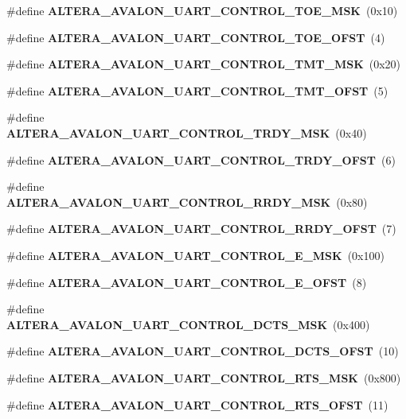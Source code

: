\begin{DoxyCompactItemize}
\item 
\#define {\bf A\+L\+T\+E\+R\+A\+\_\+\+A\+V\+A\+L\+O\+N\+\_\+\+U\+A\+R\+T\+\_\+\+C\+O\+N\+T\+R\+O\+L\+\_\+\+T\+O\+E\+\_\+\+M\+SK}~(0x10)
\item 
\#define {\bf A\+L\+T\+E\+R\+A\+\_\+\+A\+V\+A\+L\+O\+N\+\_\+\+U\+A\+R\+T\+\_\+\+C\+O\+N\+T\+R\+O\+L\+\_\+\+T\+O\+E\+\_\+\+O\+F\+ST}~(4)
\item 
\#define {\bf A\+L\+T\+E\+R\+A\+\_\+\+A\+V\+A\+L\+O\+N\+\_\+\+U\+A\+R\+T\+\_\+\+C\+O\+N\+T\+R\+O\+L\+\_\+\+T\+M\+T\+\_\+\+M\+SK}~(0x20)
\item 
\#define {\bf A\+L\+T\+E\+R\+A\+\_\+\+A\+V\+A\+L\+O\+N\+\_\+\+U\+A\+R\+T\+\_\+\+C\+O\+N\+T\+R\+O\+L\+\_\+\+T\+M\+T\+\_\+\+O\+F\+ST}~(5)
\item 
\#define {\bf A\+L\+T\+E\+R\+A\+\_\+\+A\+V\+A\+L\+O\+N\+\_\+\+U\+A\+R\+T\+\_\+\+C\+O\+N\+T\+R\+O\+L\+\_\+\+T\+R\+D\+Y\+\_\+\+M\+SK}~(0x40)
\item 
\#define {\bf A\+L\+T\+E\+R\+A\+\_\+\+A\+V\+A\+L\+O\+N\+\_\+\+U\+A\+R\+T\+\_\+\+C\+O\+N\+T\+R\+O\+L\+\_\+\+T\+R\+D\+Y\+\_\+\+O\+F\+ST}~(6)
\item 
\#define {\bf A\+L\+T\+E\+R\+A\+\_\+\+A\+V\+A\+L\+O\+N\+\_\+\+U\+A\+R\+T\+\_\+\+C\+O\+N\+T\+R\+O\+L\+\_\+\+R\+R\+D\+Y\+\_\+\+M\+SK}~(0x80)
\item 
\#define {\bf A\+L\+T\+E\+R\+A\+\_\+\+A\+V\+A\+L\+O\+N\+\_\+\+U\+A\+R\+T\+\_\+\+C\+O\+N\+T\+R\+O\+L\+\_\+\+R\+R\+D\+Y\+\_\+\+O\+F\+ST}~(7)
\item 
\#define {\bf A\+L\+T\+E\+R\+A\+\_\+\+A\+V\+A\+L\+O\+N\+\_\+\+U\+A\+R\+T\+\_\+\+C\+O\+N\+T\+R\+O\+L\+\_\+\+E\+\_\+\+M\+SK}~(0x100)
\item 
\#define {\bf A\+L\+T\+E\+R\+A\+\_\+\+A\+V\+A\+L\+O\+N\+\_\+\+U\+A\+R\+T\+\_\+\+C\+O\+N\+T\+R\+O\+L\+\_\+\+E\+\_\+\+O\+F\+ST}~(8)
\item 
\#define {\bf A\+L\+T\+E\+R\+A\+\_\+\+A\+V\+A\+L\+O\+N\+\_\+\+U\+A\+R\+T\+\_\+\+C\+O\+N\+T\+R\+O\+L\+\_\+\+D\+C\+T\+S\+\_\+\+M\+SK}~(0x400)
\item 
\#define {\bf A\+L\+T\+E\+R\+A\+\_\+\+A\+V\+A\+L\+O\+N\+\_\+\+U\+A\+R\+T\+\_\+\+C\+O\+N\+T\+R\+O\+L\+\_\+\+D\+C\+T\+S\+\_\+\+O\+F\+ST}~(10)
\item 
\#define {\bf A\+L\+T\+E\+R\+A\+\_\+\+A\+V\+A\+L\+O\+N\+\_\+\+U\+A\+R\+T\+\_\+\+C\+O\+N\+T\+R\+O\+L\+\_\+\+R\+T\+S\+\_\+\+M\+SK}~(0x800)
\item 
\#define {\bf A\+L\+T\+E\+R\+A\+\_\+\+A\+V\+A\+L\+O\+N\+\_\+\+U\+A\+R\+T\+\_\+\+C\+O\+N\+T\+R\+O\+L\+\_\+\+R\+T\+S\+\_\+\+O\+F\+ST}~(11)
\item 

\end{DoxyCompactItemize}
